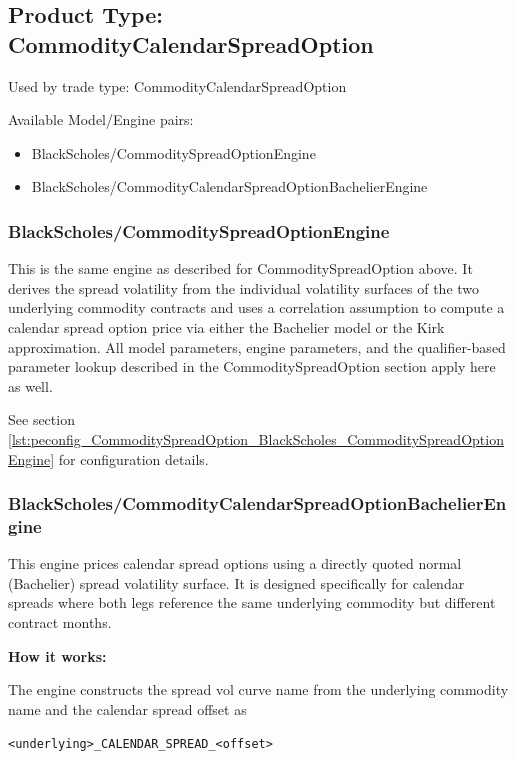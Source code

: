 \subsection{Product Type: CommodityCalendarSpreadOption}

Used by trade type: CommodityCalendarSpreadOption

Available Model/Engine pairs:

\begin{itemize}
\item BlackScholes/CommoditySpreadOptionEngine
\item BlackScholes/CommodityCalendarSpreadOptionBachelierEngine
\end{itemize}

\subsubsection{BlackScholes/CommoditySpreadOptionEngine}

This is the same engine as described for CommoditySpreadOption above. It derives the spread volatility from the
individual volatility surfaces of the two underlying commodity contracts and uses a correlation assumption to compute a
calendar spread option price via either the Bachelier model or the Kirk approximation. All model parameters, engine
parameters, and the qualifier-based parameter lookup described in the CommoditySpreadOption section apply here as well.

See section \ref{lst:peconfig_CommoditySpreadOption_BlackScholes_CommoditySpreadOptionEngine} for configuration details.

\subsubsection{BlackScholes/CommodityCalendarSpreadOptionBachelierEngine}

This engine prices calendar spread options using a directly quoted normal (Bachelier) spread volatility surface. It is
designed specifically for calendar spreads where both legs reference the same underlying commodity but different contract
months.

\textbf{How it works:}

The engine constructs the spread vol curve name from the underlying commodity name and the calendar spread offset as

\texttt{<underlying>\_CALENDAR\_SPREAD\_<offset>}

